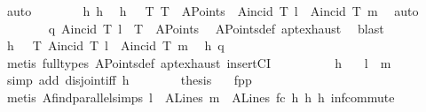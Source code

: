 \begin{isabellebody}
\ auto\isanewline
\ \ \ \ \ \ \isamarkupfalse%
\ h{}\ h{}\ \isamarkupfalse%
\ h{}{\isacharcolon}{\kern0pt}\ {\isachardoublequoteopen}{\isasymnot}\ {\isacharparenleft}{\kern0pt}{\isasymexists}\ T{\isachardot}{\kern0pt}\ T\ {\isasymin}\ A{}Points\ {\isasymand}\ A{}incid\ T\ l\ {\isasymand}\ A{}incid\ T\ m{\isacharparenright}{\kern0pt}{\isachardoublequoteclose}\ \isamarkupfalse%
\ auto\isanewline
\ \ \ \ \ \ \isamarkupfalse%
\ q{\isacharcolon}{\kern0pt}\ {\isachardoublequoteopen}A{}incid\ T\ l\ {\isacharequal}{\kern0pt}{\isacharequal}{\kern0pt}{\isachargreater}{\kern0pt}\ T\ {\isasymin}\ A{}Points{\isachardoublequoteclose}\ \isamarkupfalse%
\ A{}Points{\isacharunderscore}{\kern0pt}def\ a{}pt{\isachardot}{\kern0pt}exhaust\ \isamarkupfalse%
\ blast\isanewline
\ \ \ \ \ \ \isamarkupfalse%
\ h{}{\isacharcolon}{\kern0pt}\ {\isachardoublequoteopen}{\isasymnot}\ {\isacharparenleft}{\kern0pt}{\isasymexists}\ T{\isachardot}{\kern0pt}\ A{}incid\ T\ l\ {\isasymand}\ A{}incid\ T\ m{\isacharparenright}{\kern0pt}{\isachardoublequoteclose}\ \isamarkupfalse%
\ h{}\ q\ \isamarkupfalse%
\ {\isacharparenleft}{\kern0pt}metis\ {\isacharparenleft}{\kern0pt}full{\isacharunderscore}{\kern0pt}types{\isacharparenright}{\kern0pt}\ A{}Points{\isacharunderscore}{\kern0pt}def\ a{}pt{\isachardot}{\kern0pt}exhaust\ insertCI{\isacharparenright}{\kern0pt}\ \ \isanewline
\ \ \ \ \ \ \isamarkupfalse%
\ h{}\ \isamarkupfalse%
\ {}{\isacharcolon}{\kern0pt}\ {\isachardoublequoteopen}l\ {\isasyminter}\ m\ {\isacharequal}{\kern0pt}\ {\isacharbraceleft}{\kern0pt}{\isacharbraceright}{\kern0pt}{\isachardoublequoteclose}\ \isamarkupfalse%
\ {\isacharparenleft}{\kern0pt}simp\ add{\isacharcolon}{\kern0pt}\ disjoint{\isacharunderscore}{\kern0pt}iff\ h{}{\isacharparenright}{\kern0pt}\isanewline
\ \ \ \ \ \ \isamarkupfalse%
\ {\isacharquery}{\kern0pt}thesis\ \isamarkupfalse%
\ {}\ fpp\ \ \isamarkupfalse%
\ {\isacharparenleft}{\kern0pt}metis\ A{}find{\isacharunderscore}{\kern0pt}parallel{\isachardot}{\kern0pt}simps\ {\isacartoucheopen}l\ {\isasymin}\ A{}Lines{\isacartoucheclose}\ {\isacartoucheopen}m\ {\isasymin}\ A{}Lines{\isacartoucheclose}\ f{}c\ h{}\ h{}\ h{}\ inf{\isacharunderscore}{\kern0pt}commute{\isacharparenright}{\kern0pt}\ \ \ \ \ \isanewline

\end{isabellebody}
